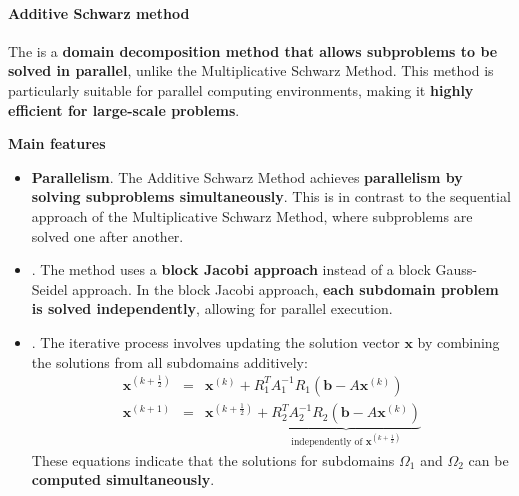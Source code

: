 \paragraph{Additive Schwarz method}

The  is a \textbf{domain decomposition method that allows subproblems to be solved in parallel}, unlike the Multiplicative Schwarz Method. This method is particularly suitable for parallel computing environments, making it \textbf{highly efficient for large-scale problems}.

\highspace
\begin{flushleft}
    \textcolor{Green3}{ \textbf{Main features}}
\end{flushleft}
\begin{itemize}
    \item[\textcolor{Green3}{\faIcon{check}}] \textcolor{Green3}{\textbf{Parallelism}}. The Additive Schwarz Method achieves \textbf{parallelism by solving subproblems simultaneously}. This is in contrast to the sequential approach of the Multiplicative Schwarz Method, where subproblems are solved one after another.

    \item {}. The method uses a \textbf{block Jacobi approach} instead of a block Gauss-Seidel approach. In the block Jacobi approach, \textbf{each subdomain problem is solved independently}, allowing for parallel execution.
    
    \item {}. The iterative process involves updating the solution vector $\mathbf{x}$ by combining the solutions from all subdomains additively:
    \begin{equation*}
        \begin{array}{rcl}
            \mathbf{x}^{\left(k+\frac{1}{2}\right)} &=& \mathbf{x}^{(k)} + R_{1}^{T} A_{1}^{-1} R_{1} \left(\mathbf{b} - A \mathbf{x}^{(k)}\right) \\ [.7em]
            \mathbf{x}^{(k+1)} &=& \mathbf{x}^{\left(k+\frac{1}{2}\right)} + \underbrace{R_{2}^{T} A_{2}^{-1} R_{2} \left(\mathbf{b} - A \mathbf{x}^{(k)}\right)}_{\text{independently of }\mathbf{x}^{\left(k+\frac{1}{2}\right)}}
        \end{array}
    \end{equation*}
    These equations indicate that the solutions for subdomains $\Omega_{1}$ and $\Omega_{2}$ can be \textbf{computed simultaneously}.


\end{itemize}
